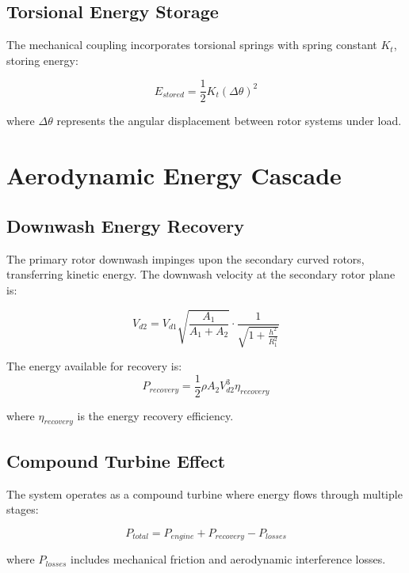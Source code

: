 \documentclass[12pt,a4paper]{article}
\begin{document}
\subsection{Torsional Energy Storage}

The mechanical coupling incorporates torsional springs with spring constant $K_t$, storing energy:

\begin{equation}
E_{stored} = \frac{1}{2}K_t(\Delta\theta)^2
\end{equation}

where $\Delta\theta$ represents the angular displacement between rotor systems under load.

\section{Aerodynamic Energy Cascade}

\subsection{Downwash Energy Recovery}

The primary rotor downwash impinges upon the secondary curved rotors, transferring kinetic energy. The downwash velocity at the secondary rotor plane is:

\begin{equation}
V_{d2} = V_{d1}\sqrt{\frac{A_1}{A_1 + A_2}} \cdot \frac{1}{\sqrt{1 + \frac{h^2}{R_1^2}}}
\end{equation}

The energy available for recovery is:
\begin{equation}
P_{recovery} = \frac{1}{2}\rho A_2 V_{d2}^3 \eta_{recovery}
\end{equation}

where $\eta_{recovery}$ is the energy recovery efficiency.

\subsection{Compound Turbine Effect}

The system operates as a compound turbine where energy flows through multiple stages:

\begin{equation}
P_{total} = P_{engine} + P_{recovery} - P_{losses}
\end{equation}

where $P_{losses}$ includes mechanical friction and aerodynamic interference losses.
\end{document}

